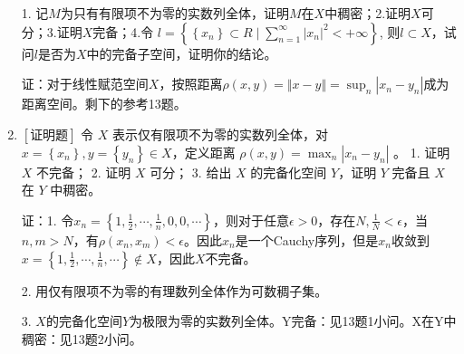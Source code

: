 \documentclass{article}
\begin{document}
\begin{enumerate}
1. 记$M$为只有有限项不为零的实数列全体，证明$M$在$X$中稠密；2.证明$X$可分；3.证明$X$完备；4.令 $l=\left\{\left\{x_n\right\} \subset R\mid \sum_{n=1}^{\infty}\left| x_n \right|^2 <+\infty \right\}$, 则$l\subset X$，试问$l$是否为$X$中的完备子空间，证明你的结论。

证：对于线性赋范空间$X$，按照距离$\rho(x, y) = \Vert x - y\Vert = \sup_n \left| x_n - y_n \right|$成为距离空间。剩下的参考13题。

\item $\left[\textbf{证明题}\right]$ 令 $X$ 表示仅有限项不为零的实数列全体，对 $x=\left\{x_n\right\}, y=\left\{y_n\right\} \in X$，定义距离 $\rho(x, y)=\max _n\left|x_n-y_n\right|$ 。 1. 证明 $X$ 不完备； 2. 证明 $X$ 可分； 3. 给出 $X$ 的完备化空间 $Y$，证明 $Y$ 完备且 $X$ 在 $Y$ 中稠密。

证：1. 令$x_n = \left\{1, \frac{1}{2}, \cdots, \frac{1}{n}, 0, 0, \cdots\right\}$，则对于任意$\epsilon > 0$，存在$N, \frac{1}{N} < \epsilon$，当$n, m > N$，有$\rho(x_n, x_m) < \epsilon$。因此${x_n}$是一个Cauchy序列，但是${x_n}$收敛到$x = \left\{1, \frac{1}{2}, \cdots, \frac{1}{n}, \cdots \right\} \notin X$，因此$X$不完备。

2. 用仅有限项不为零的有理数列全体作为可数稠子集。

3. $X$的完备化空间$Y$为极限为零的实数列全体。Y完备：见13题1小问。X在Y中稠密：见13题2小问。

\end{enumerate}
\end{document}
